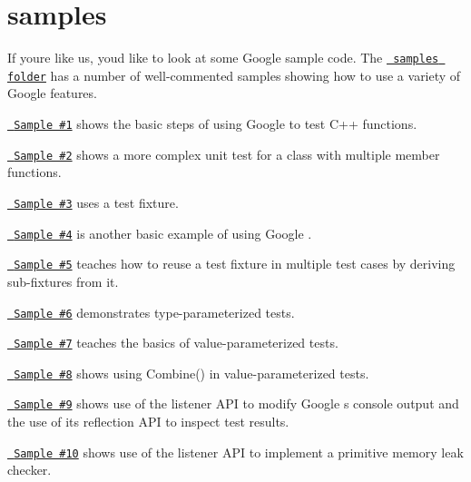 \chapter{samples}
\hypertarget{md_libraries_2fc_2include_2fc_2crypto_2webauthn__json_2thirdparty_2gtest_2googletest_2docs_2samples}{}\label{md_libraries_2fc_2include_2fc_2crypto_2webauthn__json_2thirdparty_2gtest_2googletest_2docs_2samples}
If you\textquotesingle{}re like us, you\textquotesingle{}d like to look at some Google  sample code. The \href{../samples}{\texttt{ samples folder}} has a number of well-\/commented samples showing how to use a variety of Google  features.


\begin{DoxyItemize}
\item \href{../samples/sample1_unittest.cc}{\texttt{ Sample \#1}} shows the basic steps of using Google  to test C++ functions.
\item \href{../samples/sample2_unittest.cc}{\texttt{ Sample \#2}} shows a more complex unit test for a class with multiple member functions.
\item \href{../samples/sample3_unittest.cc}{\texttt{ Sample \#3}} uses a test fixture.
\item \href{../samples/sample4_unittest.cc}{\texttt{ Sample \#4}} is another basic example of using Google .
\item \href{../samples/sample5_unittest.cc}{\texttt{ Sample \#5}} teaches how to reuse a test fixture in multiple test cases by deriving sub-\/fixtures from it.
\item \href{../samples/sample6_unittest.cc}{\texttt{ Sample \#6}} demonstrates type-\/parameterized tests.
\item \href{../samples/sample7_unittest.cc}{\texttt{ Sample \#7}} teaches the basics of value-\/parameterized tests.
\item \href{../samples/sample8_unittest.cc}{\texttt{ Sample \#8}} shows using {\ttfamily Combine()} in value-\/parameterized tests.
\item \href{../samples/sample9_unittest.cc}{\texttt{ Sample \#9}} shows use of the listener API to modify Google \textquotesingle{}s console output and the use of its reflection API to inspect test results.
\item \href{../samples/sample10_unittest.cc}{\texttt{ Sample \#10}} shows use of the listener API to implement a primitive memory leak checker. 
\end{DoxyItemize}